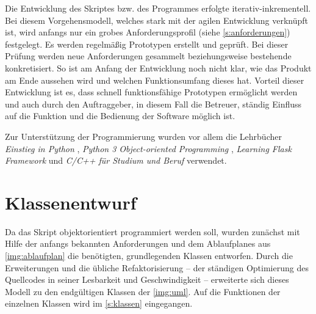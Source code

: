 \documentclass[a4paper,12pt,bibliography=totoc, listof=totoc,titlepage,pointlessnumbers]{scrreprt}
\begin{document}
Die Entwicklung des Skriptes bzw. des Programmes erfolgte iterativ-inkrementell. Bei diesem Vorgehensmodell, welches stark mit der agilen Entwicklung verknüpft ist, wird anfangs nur ein grobes Anforderungsprofil (siehe \autoref{s:anforderungen}) festgelegt. Es werden regelmäßig Prototypen erstellt und geprüft. Bei dieser Prüfung werden neue Anforderungen gesammelt beziehungsweise bestehende konkretisiert. So ist am Anfang der Entwicklung noch nicht klar, wie das Produkt am Ende aussehen wird und welchen Funktionsumfang dieses hat. Vorteil dieser Entwicklung ist es, dass schnell funktionsfähige Prototypen ermöglicht werden und auch durch den Auftraggeber, in diesem Fall die Betreuer, ständig Einfluss auf die Funktion und die Bedienung der Software möglich ist. \citep[S. 33f]{uml}

Zur Unterstützung der Programmierung wurden vor allem die Lehrbücher \textit{Einstieg in Python} \citep{python}, \textit{Python 3 Object-oriented Programming} \citep{python3oop}, \textit{Learning Flask Framework} \citep{flask} und \textit{C/C++ für Studium und Beruf} \citep{cpp} verwendet.

\section{Klassenentwurf}
Da das Skript objektorientiert programmiert werden soll, wurden zunächst mit Hilfe der anfangs bekannten Anforderungen und dem Ablaufplanes aus \autoref{img:ablaufplan} die benötigten, grundlegenden Klassen entworfen. Durch die Erweiterungen und die übliche Refaktorisierung -- der ständigen Optimierung des Quellcodes in seiner Lesbarkeit und Geschwindigkeit \citep[S. 255]{uml} -- erweiterte sich dieses Modell zu den endgültigen Klassen der \autoref{img:uml}. Auf die Funktionen der einzelnen Klassen wird im \autoref{s:klassen} eingegangen.
\end{document}
